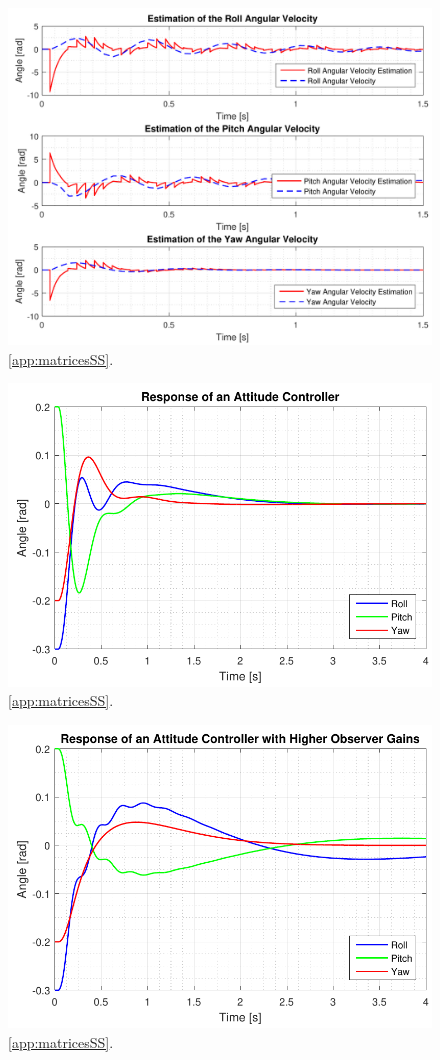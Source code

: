 \begin{figure}[H]
	\centering
	\includegraphics[scale=1]{figures/ssObsHigh.pdf}
	\caption{\autoref{app:matricesSS}.}
	\label{fig:TranslationalControlDiagram}
\end{figure}

\begin{figure}[H]
	\centering
	\includegraphics[scale=1]{figures/ssEqObsFinal.pdf}
	\caption{\autoref{app:matricesSS}.}
	\label{fig:TranslationalControlDiagram}
\end{figure}

\begin{figure}[H]
	\centering
	\includegraphics[scale=1]{figures/ssEqObsHigh.pdf}
	\caption{\autoref{app:matricesSS}.}
	\label{fig:TranslationalControlDiagram}
\end{figure}
